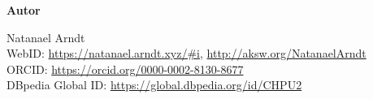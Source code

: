 \begin{flushleft}
  \small
\strut


%
%

\vfill

\textbf{Autor}

Natanael Arndt\\
WebID: \url{https://natanael.arndt.xyz/#i}, \url{http://aksw.org/NatanaelArndt}\\
ORCID: \url{https://orcid.org/0000-0002-8130-8677}\\
DBpedia Global ID: \url{https://global.dbpedia.org/id/CHPU2}


\end{flushleft}
